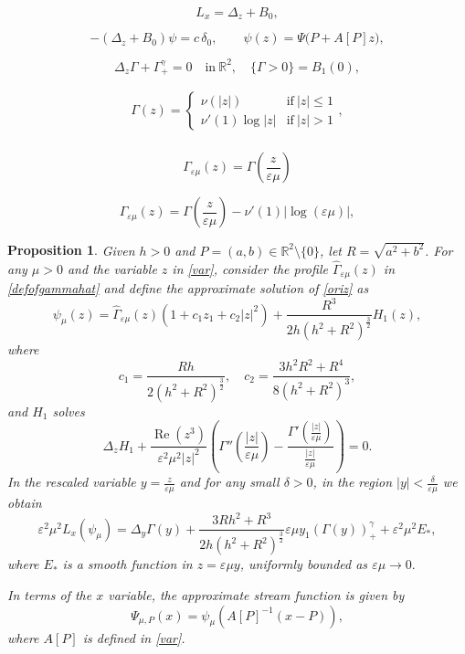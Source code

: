 \documentclass[10pt,a4paper]{amsart}
\newtheorem{prop}{Proposition}
\newcommand{\R}{\mathbb{R}}
\newcommand{\ve}{\varepsilon}
\begin{document}
\begin{equation}\label{oper}
L_x=\Delta_z+B_{0},
\end{equation}

\begin{equation}\label{oriz}
-(\Delta_z+B_0)\psi = c\,\delta_{0}, 
\qquad 
\psi(z)=\Psi\bigl(P+A[P]z\bigr),
\end{equation}

\begin{equation}\label{modelsemil}
\Delta_z\Gamma + \Gamma_+^\gamma=0 \quad \mbox{in}\ \mathbb{R}^2,
\quad \{\Gamma>0\}= B_1(0),
\end{equation}

\begin{equation}\label{defGamma}
\begin{aligned}
\Gamma(z)
  =
\left\{\begin{array}{ll}
\nu(|z|)&\mathrm{if~}|z|\leq1\\
\nu'(1)\log|z|&\mathrm{if~}|z|>1
\end{array}
\right.,\\
\end{aligned}
\end{equation}

\begin{equation}\label{erescgamma}
\Gamma_{\ve\mu}(z)=\Gamma\left(\frac{z}{\ve\mu}\right)
\end{equation}

\begin{equation}\label{defofgammahat}
\widehat{\Gamma}_{\ve\mu}(z)=\Gamma\left(\frac{z}{\ve\mu}\right)-\nu'(1)|\log(\ve\mu)|,
\end{equation}

\begin{prop}\label{propapprox}
Given $h>0$ and $P=(a,b)\in\R^2\setminus\{0\}$, let $R=\sqrt{a^2+b^2}$. For any $\mu>0$ and the variable $z$ in \eqref{var}, consider the  profile $\widehat{\Gamma}_{\ve\mu}(z)$ in \eqref{defofgammahat} and define the approximate solution of \eqref{oriz}
as \[\psi_{\mu}(z)=  \widehat{\Gamma}_{\ve\mu}(z)\left(1+c_1z_1+c_2|z|^2\right) +\frac{R^3}{2h(h^2+R^2)^{\frac{3}{2}}}H_{1}(z),\]
where \[c_1=\frac{Rh}{2(h^2+R^2)^{\frac{3}{2}}}, \quad c_2=\frac{3h^2R^2+R^4}{8(h^2+R^2)^{3}},\]
and $H_1$ solves  \[\Delta_z H_{1} +\frac{\operatorname{Re}(z^3)}{\ve^2\mu^2|z|^2}\left(\Gamma''\left(\frac{|z|}{\ve\mu}\right)-\frac{\Gamma'\left(\frac{|z|}{\ve\mu}\right)}{\frac{|z|}{\ve\mu}}\right)=0.\]
In the rescaled variable $y=\frac{z}{\ve\mu}$ and for any small $\delta>0$, in the region $|y| < \frac{\delta}{\ve\mu}$ we obtain
\[\ve^2\mu^2L_{x}(\psi_{\mu})= \Delta_y\Gamma(y) + \frac{3Rh^2+R^3}{2h(h^2+R^2)^{\frac{3}{2}}}\ve\mu y_1\left(\Gamma(y)\right)^{\gamma}_{+} + \ve^2\mu^2 E_{*},\]
where $E_{*}$ is a smooth function in $z=\ve\mu y$, uniformly bounded as $\ve\mu \to 0.$

In terms of the $x$ variable, the approximate stream function is given by
\begin{equation}\label{approxinx}
    \Psi_{\mu,P}(x)=\psi_{\mu}\left(A[P]^{-1}\left(x-P\right)\right),
\end{equation}
where $A[P]$ is defined in \eqref{var}.
\end{prop}
\end{document}
